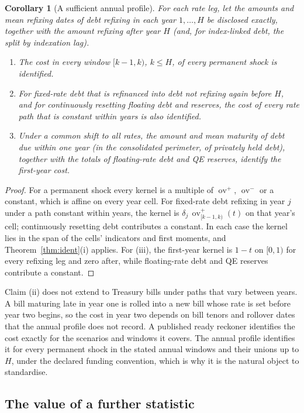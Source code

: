 \documentclass[11pt,a4paper]{article}
\newtheorem{corollary}[proposition]{Corollary}
\theoremstyle{remark}
\newcommand{\ov}{\operatorname{ov}}
\begin{document}
\begin{corollary}[A sufficient annual profile]\label{cor:profile}
For each rate leg, let the amounts and mean refixing dates of debt refixing in each year $1,\dots,H$ be disclosed exactly, together with the amount refixing after year $H$ (and, for index-linked debt, the split by indexation lag).
\begin{enumerate}[label=(\roman*)]
\item The cost in every window $[k-1,k)$, $k\le H$, of every permanent shock is identified.
\item For fixed-rate debt that is refinanced into debt not refixing again before $H$, and for continuously resetting floating debt and reserves, the cost of every rate path that is constant within years is also identified.
\item Under a common shift to all rates, the amount and mean maturity of debt due within one year (in the consolidated perimeter, of privately held debt), together with the totals of floating-rate debt and QE reserves, identify the first-year cost.
\end{enumerate}
\end{corollary}
\begin{proof}
For a permanent shock every kernel is a multiple of $\ov^+$, $\ov^-$ or a constant, which is affine on every year cell. For fixed-rate debt refixing in year $j$ under a path constant within years, the kernel is $\delta_j\,\ov^+_{[k-1,k)}(t)$ on that year's cell; continuously resetting debt contributes a constant. In each case the kernel lies in the span of the cells' indicators and first moments, and Theorem~\ref{thm:ident}(i) applies. For (iii), the first-year kernel is $1-t$ on $[0,1)$ for every refixing leg and zero after, while floating-rate debt and QE reserves contribute a constant.
\end{proof}

Claim (ii) does not extend to Treasury bills under paths that vary between years. A bill maturing late in year one is rolled into a new bill whose rate is set before year two begins, so the cost in year two depends on bill tenors and rollover dates that the annual profile does not record. A published ready reckoner identifies the cost exactly for the scenarios and windows it covers. The annual profile identifies it for every permanent shock in the stated annual windows and their unions up to $H$, under the declared funding convention, which is why it is the natural object to standardise.

\subsection{The value of a further statistic}
\end{document}
